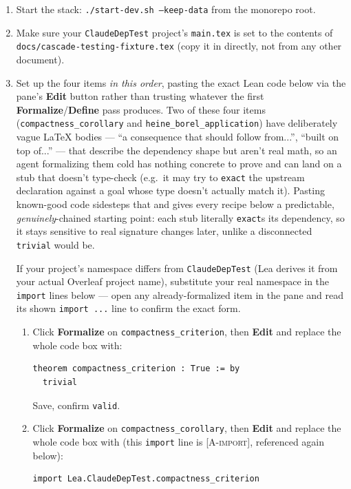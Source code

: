 \documentclass[11pt]{article}
\newcommand{\code}[1]{\texttt{#1}}
\begin{document}
\begin{enumerate}[label=\arabic*.]
  \item Start the stack: \code{./start-dev.sh --keep-data} from the
    monorepo root.
  \item Make sure your \code{ClaudeDepTest} project's \code{main.tex} is set
    to the contents of \code{docs/cascade-testing-fixture.tex} (copy it in
    directly, not from any other document).
  \item Set up the four items \emph{in this order}, pasting the exact Lean
    code below via the pane's \textbf{Edit} button rather than trusting
    whatever the first \textbf{Formalize}/\textbf{Define} pass produces.
    Two of these four items (\code{compactness\_corollary} and
    \code{heine\_borel\_application}) have deliberately vague LaTeX bodies
    --- ``a consequence that should follow from...'', ``built on top
    of...'' --- that describe the dependency shape but aren't real math, so
    an agent formalizing them cold has nothing concrete to prove and can
    land on a stub that doesn't type-check (e.g.\ it may try to
    \code{exact} the upstream declaration against a goal whose type doesn't
    actually match it). Pasting known-good code sidesteps that and gives
    every recipe below a predictable, \emph{genuinely}-chained starting
    point: each stub literally \code{exact}s its dependency, so it stays
    sensitive to real signature changes later, unlike a disconnected
    \code{trivial} would be.

    If your project's namespace differs from \code{ClaudeDepTest} (Lea
    derives it from your actual Overleaf project name), substitute your
    real namespace in the \code{import} lines below --- open any
    already-formalized item in the pane and read its shown
    \code{import ...} line to confirm the exact form.
    \begin{enumerate}[label=(\alph*)]
      \item Click \textbf{Formalize} on \code{compactness\_criterion}, then
        \textbf{Edit} and replace the whole code box with:
\begin{verbatim}
theorem compactness_criterion : True := by
  trivial
\end{verbatim}
        Save, confirm \code{valid}.
      \item Click \textbf{Formalize} on \code{compactness\_corollary}, then
        \textbf{Edit} and replace the whole code box with (this
        \code{import} line is \textsc{[A-import]}, referenced again below):
\begin{verbatim}
import Lea.ClaudeDepTest.compactness_criterion


\end{verbatim}
\end{enumerate}
\end{enumerate}
\end{document}
